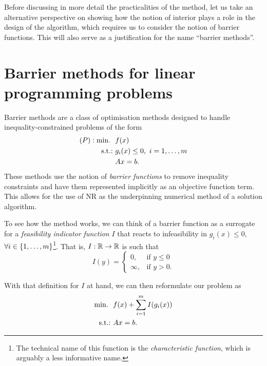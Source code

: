 Before discussing in more detail the practicalities of the method, let us take an alternative perspective on showing how the notion of interior plays a role in the design of the algorithm, which requires us to consider the notion of barrier functions. This will also serve as a justification for the name ``barrier methods''. 
	
	
\section{Barrier methods for linear programming problems}


Barrier methods are a class of optimisation methods designed to handle inequality-constrained problems of the form
	\begin{align*}
	(P) : \mathop{\text{min.~}} \ & f(x) \\
	\mathop{\text{s.t.:~}} & g_i(x) \leq 0, \ i = 1,\dots,m \\
	& Ax = b. 
	\end{align*}
	These methods use the notion of \emph{barrier functions} to remove inequality constraints and have them represented implicitly as an objective function term. This allows for the use of NR as the underpinning numerical method of a solution algorithm. 
	
To see how the method works, we can think of a barrier function as a surrogate for a \emph{feasibility indicator function} $I$ that reacts to infeasibility in $g_i(x) \leq 0$, $\forall i \in  \left\{ 1,\dots, m \right \}$\footnote{The technical name of this function is the \emph{characteristic function}, which is arguably a less informative name.}. That is, $I : \mathbb{R} \to \mathbb{R}$ is such that
	\begin{equation*}
	I(y) = \begin{cases} 0, &\text{if } y \leq 0 \\
	                     \infty, &\text{if } y > 0.  
	       \end{cases}
	\end{equation*} 

With that definition for $I$ at hand, we can then reformulate our problem as	
	\begin{align*}
		\mathop{\text{min.~}} \ & f(x) + \sum_{i=1}^m I(g_i(x)) \\
		\mathop{\text{s.t.:~}} &Ax = b. 
	\end{align*}
	
